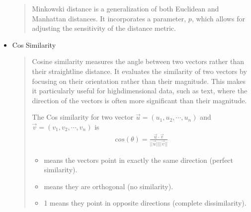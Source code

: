 \documentclass[letterpaper,11pt,english]{sphinxmanual}
\begin{document}
\begin{itemize}
\begin{quote}
\sphinxAtStartPar
Minkowski distance is a generalization of both Euclidean and Manhattan distances. It incorporates a parameter,
\(p\), which allows for adjusting the sensitivity of the distance metric.
\end{quote}

\item {} 
\sphinxAtStartPar
Cos Similarity
\begin{quote}

\sphinxAtStartPar
Cosine similarity measures the angle between two vectors rather than their straight\sphinxhyphen{}line distance.
It evaluates the similarity of two vectors by focusing on their orientation rather than their magnitude.
This makes it particularly useful for high\sphinxhyphen{}dimensional data, such as text, where the direction of the
vectors is often more significant than their magnitude.

\sphinxAtStartPar
The Cos similarity for two vector \(\vec{u} = (u_1, u_2, \cdots, u_n)\) and \(\vec{v} = (v_1, v_2, \cdots, v_n)\) is
\begin{equation*}
\begin{split}cos(\theta) = \frac{\vec{u}\cdot\vec{v}}{||\vec{u}|| ||\vec{v}||}\end{split}
\end{equation*}\begin{itemize}
\item {} 
 means the vectors point in exactly the same direction (perfect similarity).

\item {} 
 means they are orthogonal (no similarity).

\item {} 
\sphinxAtStartPar
\sphinxhyphen{}1 means they point in opposite directions (complete dissimilarity).

\end{itemize}

\begin{sphinxVerbatim}[commandchars=\\\{\}]

\end{sphinxVerbatim}


\end{quote}
\end{itemize}
\end{document}
